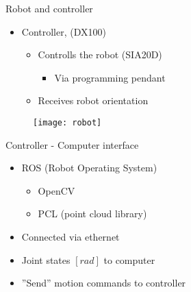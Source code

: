 \begin{frame}{Robot and controller}
\begin{itemize}
\item Controller, (DX100)
\begin{itemize}
\item Controlls the robot (SIA20D)
\begin{itemize}
\item Via programming pendant
\end{itemize}
\item Receives robot orientation 
\end{itemize}
\end{itemize}

\begin{figure}[H]
	\begin{center}
	\texttt{[image: robot]}
	\end{center}
	\end{figure}

\end{frame}
\begin{frame}{Controller - Computer interface}


\begin{itemize}
\item ROS (Robot Operating System)
\begin{itemize}
	\item OpenCV
	\item PCL (point cloud library)
\end{itemize}
\item Connected via ethernet
\item Joint states $[rad]$ to computer

\item ''Send'' motion commands to controller
\end{itemize}

\end{frame}


